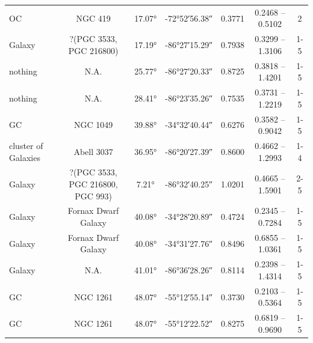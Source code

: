 \begin{longtable}{l c c c c c c}
    OC                  & NGC 419                          & \ang{17.07} & \ang{-72;52;56.38} & 0.3771   & 0.2468 -- 0.5102 & 2           \\ %
    Galaxy              & ?(PGC 3533, PGC 216800)          & \ang{17.19} & \ang{-86;27;15.29} & 0.7938   & 0.3299 -- 1.3106 & 1-5         \\ %
    nothing             & N.A.                             & \ang{25.77} & \ang{-86;27;20.33} & 0.8725   & 0.3818 -- 1.4201 & 1-5         \\ %
    nothing             & N.A.                             & \ang{28.41} & \ang{-86;23;35.26} & 0.7535   & 0.3731 -- 1.2219 & 1-5         \\ %
    GC                  & NGC 1049                         & \ang{39.88} & \ang{-34;32;40.44} & 0.6276   & 0.3582 -- 0.9042 & 1-5         \\ %
    cluster of Galaxies & Abell 3037                       & \ang{36.95} & \ang{-86;20;27.39} & 0.8600   & 0.4662 -- 1.2993 & 1-4         \\ %
    Galaxy              & ?(PGC 3533, PGC 216800, PGC 993) & \ang{7.21}  & \ang{-86;32;40.25} & 1.0201   & 0.4665 -- 1.5901 & 2-5         \\ %
    Galaxy              & Fornax Dwarf Galaxy              & \ang{40.08} & \ang{-34;28;20.89} & 0.4724   & 0.2345 -- 0.7284 & 1-5         \\ %
    Galaxy              & Fornax Dwarf Galaxy              & \ang{40.08} & \ang{-34;31;27.76} & 0.8496   & 0.6855 -- 1.0361 & 1-5         \\ %
    Galaxy              & N.A.                             & \ang{41.01} & \ang{-86;36;28.26} & 0.8114   & 0.2398 -- 1.4314 & 1-5         \\ %
    GC                  & NGC 1261                         & \ang{48.07} & \ang{-55;12;55.14} & 0.3730   & 0.2103 -- 0.5364 & 1-5         \\ %
    GC                  & NGC 1261                         & \ang{48.07} & \ang{-55;12;22.52} & 0.8275   & 0.6819 -- 0.9690 & 1-5         \\ %

\end{longtable}
